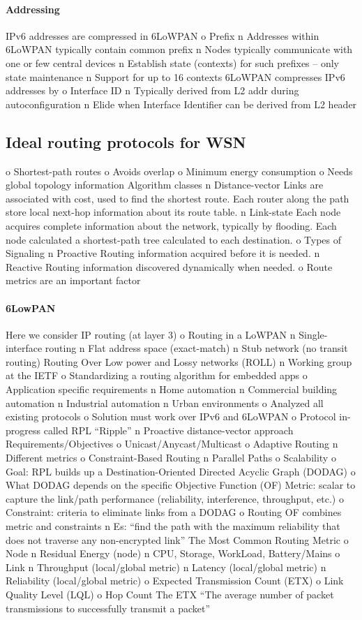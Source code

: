 \paragraph*{Addressing}
IPv6 addresses are compressed in 6LoWPAN
o Prefix
n Addresses within 6LoWPAN typically contain common prefix
n Nodes typically communicate with one or few central devices
n Establish state (contexts) for such prefixes – only state
maintenance
n Support for up to 16 contexts 6LoWPAN compresses IPv6
addresses by
o Interface ID
n Typically derived from L2 addr during autoconfiguration
n Elide when Interface Identifier can be derived from L2 header

\subsection{Ideal routing protocols for WSN}
o Shortest-path routes
o Avoids overlap
o Minimum energy consumption
o Needs global topology information
Algorithm classes
n Distance-vector
Links are associated with cost, used to find the shortest
route. Each router along the path store local next-hop
information about its route table.
n Link-state
Each node acquires complete information about the
network, typically by flooding. Each node calculated a
shortest-path tree calculated to each destination.
o Types of Signaling
n Proactive
Routing information acquired before it is needed.
n Reactive
Routing information discovered dynamically when needed.
o Route metrics are an important factor

\paragraph*{6LowPAN}
Here we consider IP routing (at
layer 3)
o Routing in a LoWPAN
n Single-interface routing
n Flat address space (exact-match)
n Stub network (no transit routing)
Routing Over Low power and Lossy networks (ROLL)
n Working group at the IETF
o Standardizing a routing algorithm for embedded
apps
o Application specific requirements
n Home automation
n Commercial building automation
n Industrial automation
n Urban environments
o Analyzed all existing protocols
o Solution must work over IPv6 and 6LoWPAN
o Protocol in-progress called RPL “Ripple”
n Proactive distance-vector approach
Requirements/Objectives
o Unicast/Anycast/Multicast
o Adaptive Routing
n Different metrics
o Constraint-Based Routing
n Parallel Paths
o Scalability
o Goal: RPL builds up a Destination-Oriented
Directed Acyclic Graph (DODAG)
o What DODAG depends on the specific
Objective Function (OF)
Metric: scalar to capture the link/path
performance (reliability, interference,
throughput, etc.)
o Constraint: criteria to eliminate links from a
DODAG
o Routing OF combines metric and constraints
n Es: “find the path with the maximum reliability
that does not traverse any non-encrypted link”
The Most Common Routing Metric
o Node
n Residual Energy (node)
n CPU, Storage, WorkLoad, Battery/Mains
o Link
n Throughput (local/global metric)
n Latency (local/global metric)
n Reliability (local/global metric)
o Expected Transmission Count (ETX)
o Link Quality Level (LQL)
o Hop Count
The ETX “The average number of packet
transmissions to successfully transmit a
packet”

